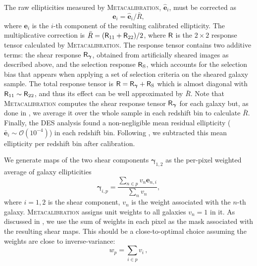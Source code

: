 \documentclass[a4paper,11pt]{article}
\newcommand{\shear}{\boldsymbol{\gamma}}
\newcommand{\ellip}{\boldsymbol{e}}
\newcommand{\mcal}{\textsc{Metacalibration}\xspace}
\begin{document}
        The raw ellipticities measured by \mcal, $\hat{\ellip}_i$, must be corrected as
        \begin{equation}\label{eq:des:ecal}
          \ellip_i=\hat{\ellip}_i/\bar{R},
        \end{equation}
        where $\ellip_i$ is the $i$-th component of the resulting calibrated ellipticity. The multiplicative correction is $\bar{R}=({\sf R}_{11}+{\sf R}_{22})/2$, where ${\sf R}$ is the $2\times 2$ response tensor calculated by \mcal. The response tensor contains two additive terms: the shear response ${\sf R}_{\shear}$, obtained from artificially sheared images as described above, and the selection response ${\sf R}_{\rm S}$, which accounts for the selection bias that appears when applying a set of selection criteria on the sheared galaxy sample. The total response tensor is ${\sf R}={\sf R}_{\shear}+{\sf R}_{\rm S}$ which is almost diagonal with ${\sf R}_{11} \sim {\sf R}_{22}$, and thus its effect can be well approximated by $\bar{R}$. Note that \mcal computes the shear response tensor ${\sf R}_{\shear}$ for each galaxy but, as done in \cite{1708.01538,1708.01533}, we average it over the whole sample in each redshift bin to calculate $\bar{R}$. Finally, the DES analysis found a non-negligible mean residual ellipticity ($\bar{\ellip}_i\sim\mathcal{O}(10^{-4})$) in each redshift bin. Following \cite{1708.01538}, we subtracted this mean ellipticity per redshift bin after calibration.

        We generate maps of the two shear components $\shear_{1,2}$ as the per-pixel weighted average of galaxy ellipticities
        \begin{equation}\label{eq:des.sh.signal}
          \shear_{i,p} = \frac{\sum_{n\in p} v_n \ellip_{n,i}}{\sum_n v_n} ,
        \end{equation}
        where $i=1,2$ is the shear component, $v_n$ is the weight associated with the $n$-th galaxy. \mcal assigns unit weights to all galaxies $v_n = 1$ in it. As discussed in \cite{2010.09717}, we use the sum of weights in each pixel as the mask associated with the resulting shear maps. This should be a close-to-optimal choice assuming the weights are close to inverse-variance:
        \begin{equation}\label{eq:des.sh.mask}
          w_p = \sum_{i \in p} v_i\,,
        \end{equation}
\end{document}
